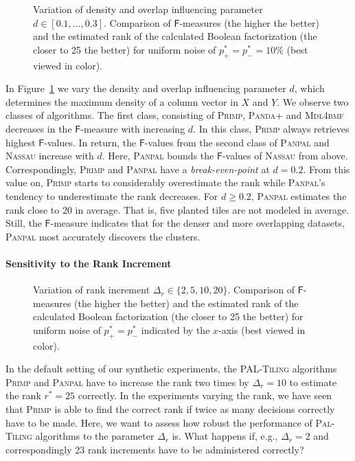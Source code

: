 \begin{figure}
\centering

\caption{Variation of density and overlap influencing parameter $d\in[0.1,\ldots,0.3]$. Comparison of $\mathsf{F}$-measures (the higher the better) and the estimated rank of the calculated Boolean factorization (the closer to 25 the better) for uniform noise of $p_+^*=p_-^*=10\%$ (best viewed in color).}
\label{fig:density}
\end{figure}
In Figure~\ref{fig:density} we vary the density and overlap influencing parameter $d$, which determines the maximum density of a column vector in $X$ and  $Y$.  We observe two classes of algorithms. The first class, consisting of \textsc{Primp}, \textsc{Panda+} and \textsc{Mdl4bmf} decreases in the $\mathsf{F}$-measure with increasing $d$. In this class, \textsc{Primp} always retrieves highest $\mathsf{F}$-values. In return, the $\mathsf{F}$-values from the second class of \textsc{Panpal} and \textsc{Nassau} increase with $d$. Here, \textsc{Panpal} bounds the $\mathsf{F}$-values of \textsc{Nassau} from above. Correspondingly, \textsc{Primp} and \textsc{Panpal} have a \textit{break-even-point} at $d=0.2$. From this value on, \textsc{Primp} starts to considerably overestimate the rank while \textsc{Panpal}'s tendency to underestimate the rank decreases. For $d\geq0.2$, \textsc{Panpal} estimates the rank close to 20 in average. That is, five planted tiles are not modeled in average. Still, the $\mathsf{F}$-measure indicates that for the denser and more overlapping datasets, \textsc{Panpal} most accurately discovers the clusters. 
\paragraph{Sensitivity to the Rank Increment}
\begin{figure}
\centering

\caption{Variation of rank increment $\Delta_r\in\{2,5,10,20\}$. Comparison of $\mathsf{F}$-measures (the higher the better) and the estimated rank of the calculated Boolean factorization (the closer to 25 the better) for uniform noise of $p_+^*=p_-^*$ indicated by the $x$-axis (best viewed in color).}
\label{fig:rInc}
\end{figure}
In the default setting of our synthetic experiments, the \textsc{PAL-Tiling} algorithms \textsc{Primp} and \textsc{Panpal} have to increase the rank two times by $\Delta_r=10$ to estimate the rank $r^*=25$ correctly. In the experiments varying the rank, we have seen that \textsc{Primp} is able to find the correct rank if twice as many decisions correctly have to be made.  Here, we want to assess how robust the performance of \textsc{Pal-Tiling} algorithms to the parameter $\Delta_r$ is. What happens if, e.g., $\Delta_r=2$ and correspondingly 23 rank increments have to be administered correctly?

